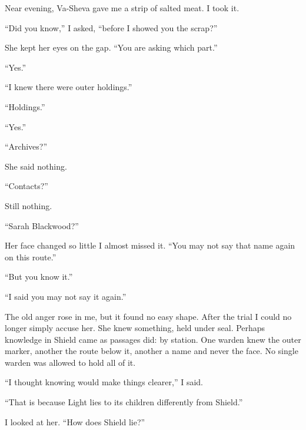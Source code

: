 Near evening, Va-Sheva gave me a strip of salted meat. I took it.\par

``Did you know,'' I asked, ``before I showed you the scrap?''\par

She kept her eyes on the gap. ``You are asking which part.''\par

``Yes.''\par

``I knew there were outer holdings.''\par

``Holdings.''\par

``Yes.''\par

``Archives?''\par

She said nothing.\par

``Contacts?''\par

Still nothing.\par

``Sarah Blackwood?''\par

Her face changed so little I almost missed it. ``You may not say that name again on this route.''\par

``But you know it.''\par

``I said you may not say it again.''\par

The old anger rose in me, but it found no easy shape. After the trial I could no longer simply accuse her. She knew something, held under seal. Perhaps knowledge in Shield came as passages did: by station. One warden knew the outer marker, another the route below it, another a name and never the face. No single warden was allowed to hold all of it.\par

``I thought knowing would make things clearer,'' I said.\par

``That is because Light lies to its children differently from Shield.''\par

I looked at her. ``How does Shield lie?''\par

